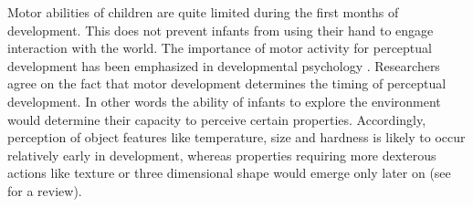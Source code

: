 Motor abilities of children are quite
limited during the first months of development. This does not
prevent infants from using their hand to engage interaction
with the world. The importance of motor activity for perceptual 
development has been emphasized in developmental psychology 
\cite{hofsten04motor,gibson88explore}. Researchers agree on
the fact that motor development determines the timing of
perceptual development. In other words the ability of infants 
to explore the environment would determine their capacity to 
perceive certain properties. 
Accordingly, perception of object features like temperature, 
size and hardness is likely to occur relatively early in development, 
whereas properties requiring more dexterous actions like texture or 
three dimensional shape would emerge only later on (see \cite{bushnell93motor} 
for a review).
%